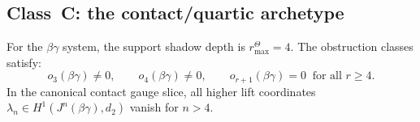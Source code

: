 
\subsection{Class~C: the contact/quartic archetype}

\begin{theorem}[$r^\Theta_{\max}(\beta\gamma) = 4$]
For the $\beta\gamma$ system, the support shadow depth is
\(r^\Theta_{\max}=4\). The obstruction classes satisfy:
\begin{equation}%
o_3(\beta\gamma) \neq 0,
\qquad
o_4(\beta\gamma) \neq 0,
\qquad
o_{r+1}(\beta\gamma) = 0
\;\;\text{for all } r \geq 4.
\end{equation}
In the canonical contact gauge slice, all higher lift coordinates
\(\lambda_n\in H^1(J^n(\beta\gamma),d_2)\) vanish for \(n>4\).
\end{theorem}

